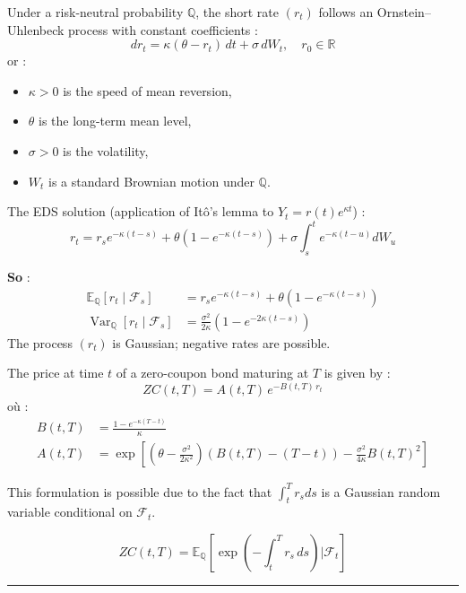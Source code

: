 \begin{f}
	
	Under a risk-neutral probability \(\mathbb{Q}\), the short rate \((r_t)\) follows an Ornstein–Uhlenbeck process with constant coefficients :
	\[
	dr_t = \kappa(\theta - r_t)\, dt + \sigma\, dW_t, \quad r_0 \in \mathbb{R}
	\]
	or :
	\begin{itemize}[nosep]
		\item \(\kappa > 0\) is the speed of mean reversion,
		\item \(\theta\) is the long-term mean level,
		\item \(\sigma > 0\) is the volatility,
		\item \(W_t\) is a standard Brownian motion under \(\mathbb{Q}\).
	\end{itemize}
	
The EDS solution (application of Itô’s lemma to \(Y_{t}=r(t) e^{\kappa t}\)) :
	\[
	r_t = r_s e^{-\kappa(t-s)} + \theta(1 - e^{-\kappa(t-s)}) + \sigma \int_s^t e^{-\kappa(t-u)} dW_u
	\]
	
	\textbf{So} :
	\[
	\begin{aligned}
		\mathbb{E}_\mathbb{Q}[r_t \mid \mathcal{F}_s] &= r_s e^{-\kappa(t-s)} + \theta(1 - e^{-\kappa(t-s)}) \\
		\operatorname{Var}_\mathbb{Q}[r_t \mid \mathcal{F}_s] &= \frac{\sigma^2}{2\kappa} \left(1 - e^{-2\kappa(t-s)}\right)
	\end{aligned}
	\]
The process \((r_t)\) is Gaussian; negative rates are possible.
	
\end{f}

\begin{f}

The price at time \(t\) of a zero-coupon bond maturing at \(T\) is given by :
\[
ZC(t, T) = A(t, T) \, e^{-B(t, T)\, r_t}
\]
où :
\[
\begin{aligned}
	B(t, T) &= \frac{1 - e^{-\kappa(T - t)}}{\kappa} \\
	A(t, T) &= \exp \left[ \left(\theta - \frac{\sigma^2}{2\kappa^2}\right) (B(t, T) - (T - t)) - \frac{\sigma^2}{4\kappa} B(t, T)^2 \right]
\end{aligned}
\]

This formulation is possible due to the fact that \(\int_t^T r_s ds\) is a Gaussian random variable conditional on \(\mathcal{F}_t\).

\[
ZC(t, T) = \mathbb{E}_\mathbb{Q} \left[ \exp\left( -\int_t^T r_s\, ds \right) \Big| \mathcal{F}_t \right]
\]

\end{f}
\hrule

